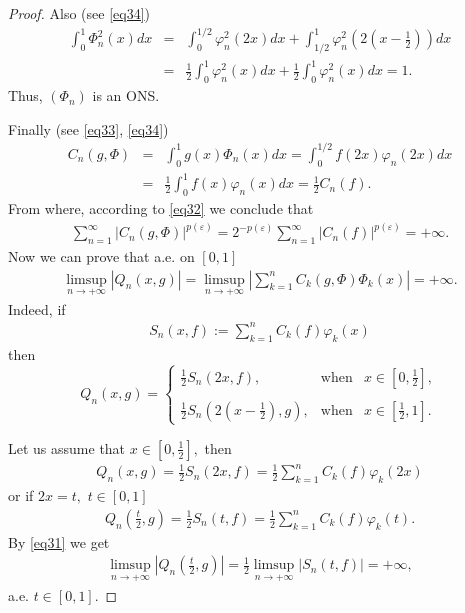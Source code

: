 \documentclass{publmathdeb}
\begin{document}
\begin{proof}
		Also (see \eqref{eq34})
		\begin{eqnarray*}
			\int_{0}^{1} \Phi_n^2 (x) dx &=& \int_{0}^{1/2} \varphi_{n}^2(2x) dx +  \int_{1/2}^{1} \varphi_{n}^2 \left(2\left(x-\frac{1}{2}\right)\right) dx \\
			&=& \frac{1}{2} \int_{0}^{1} \varphi_{n}^2(x) dx + \frac{1}{2} \int_{0}^{1} \varphi_{n}^2(x) dx =1.
		\end{eqnarray*}
		Thus, $(\Phi_n)$ is an ONS.
		
		Finally (see \eqref{eq33}, \eqref{eq34})
		\begin{eqnarray*}
			C_n(g,\Phi) &=&  \int_{0}^{1} g(x) \Phi_n(x) dx= \int_{0}^{1/2}f(2x) \varphi_{n}(2x) dx \\
			&=&  \frac{1}{2} \int_{0}^{1}  f(x)\varphi_{n}(x) dx =\frac{1}{2} C_n(f).
		\end{eqnarray*}
		From where, according to \eqref{eq32} we conclude that
		\begin{eqnarray*}
			\sum_{n=1}^{\infty} \left|C_n(g,\Phi)\right|^{p(\varepsilon)} = 2^{- p (\varepsilon)} \sum_{n=1}^{\infty} \left|C_n(f)\right|^{p(\varepsilon)} = + \infty.
		\end{eqnarray*}
		Now we can prove that a.e. on $[0,1]$
		\begin{eqnarray*}
			\limsup_{n \rightarrow +\infty} \left|Q_n(x,g)\right| = \limsup_{n \rightarrow +\infty} \left|\sum_{k=1}^{n} C_k(g,\Phi)\Phi_k (x)\right|=+\infty.
		\end{eqnarray*}
		Indeed, if 
		\begin{eqnarray*}
			S_n(x,f) := \sum_{k=1}^{n} C_k(f) \varphi_{k}(x) 
		\end{eqnarray*}
		then
		\begin{equation*}
			Q_n\left( x,g\right) =\left\{ 
			\begin{array}{ccc}
				\frac{1}{2}S_n(2x,f), & \text{when} & x\in \left[ 0,\frac{1}{2}\right], \\ 
				\\
				\frac{1}{2}S_n(2(x-\frac{1}{2}),g), & \text{when} & x\in \left[ \frac{1}{2},1\right].
			\end{array}%
			\right.
		\end{equation*}
		
		Let us assume that $x\in \left[0,  \frac{1}{2}\right],$ then
		\begin{eqnarray*}
			Q_n\left( x,g\right) = \frac{1}{2}S_n(2x,f) = \frac{1}{2} \sum_{k=1}^{n} C_k(f) \varphi_{k}(2x) 
		\end{eqnarray*}
		or if $2x=t,$ $t\in [0,1]$
		\begin{eqnarray*}
			Q_n \left(\frac{t}{2}, g\right) =  \frac{1}{2} S_n(t,f)=\frac{1}{2} \sum_{k=1}^{n} C_k(f) \varphi_{k}(t). 
		\end{eqnarray*}
		By \eqref{eq31} we get
		\begin{eqnarray*}
			\limsup_{n \rightarrow +\infty} \left|	Q_n \left(\frac{t}{2}, g\right)\right| = \frac{1}{2} \limsup_{n \rightarrow +\infty} \left| S_n(t,f) \right| = + \infty,
		\end{eqnarray*}
		a.e. $t \in \left[0, 1 \right]. $
		

\end{proof}
\end{document}
